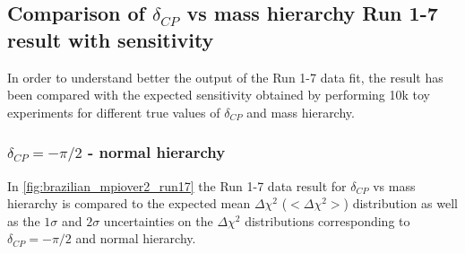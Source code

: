 
\clearpage





%
%

\subsection {Comparison of $\delta_{CP}$ vs mass hierarchy Run 1-7 result with sensitivity}
\label{sec:comparison_data_sensi_dcp_run17}

In order to understand better the output of the Run 1-7 data fit, the result 
has been compared with the expected sensitivity obtained by performing 10k toy experiments
for different true values of $\delta_{CP}$ and mass hierarchy.

\subsubsection {$\delta_{CP} = -\pi/2$ - normal hierarchy}
\label{sec:dcp_mpiover2_nh_run17}

In \cref{fig:brazilian_mpiover2_run17} the Run 1-7 data result for $\delta_{CP}$ vs mass hierarchy 
is compared to the expected mean $\Delta \chi^2$ ($<\Delta \chi^2>$)
distribution as well as the $1\sigma$ and $2\sigma$ 
uncertainties on the $\Delta \chi^2$ distributions
corresponding to $\delta_{CP}=-\pi/2$ and normal hierarchy.


